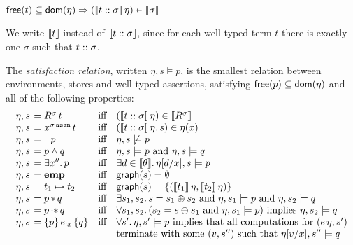 \documentclass[12pt,a4paper]{article}
\newcommand{\emp}{\ensuremath{\mathbf{emp}}}
\begin{document}
\begin{lemma}
  $\mathsf{free}(t) \subseteq \mathsf{dom}(\eta) \Rightarrow (\llbracket{t}\mathrel{::}{\sigma}\rrbracket\,\eta)\in\llbracket\sigma\rrbracket$
\end{lemma}

We write $\llbracket t\rrbracket$ instead of $\llbracket{t}\mathrel{::}{\sigma}\rrbracket$, since for each well typed term $t$ there is
exactly one $\sigma$ such that ${t}\mathrel{::}{\sigma}$.

\begin{definition}
  The {\em satisfaction relation}, written $\eta,s \models p$, is the smallest relation between 
  environments, stores and well typed assertions, satisfying $\mathsf{free}(p) \subseteq \mathsf{dom}(\eta)$ and all of the
  following properties:
  \[\begin{array}{lcl}
    \eta,s \models \app{R^\sigma}{t}
    &\text{iff}& (\semantic{\tj{t}{\sigma}}\,\eta) \in \semantic{R^\sigma} \\
    \eta,s \models \app{x^{\tassn[\sigma]}}{t}
    &\text{iff}& (\semantic{\tj{t}{\sigma}}\,\eta,s) \in \eta(x) \\
    \eta,s \models \neg p
    &\text{iff}& \eta,s \not\models p \\
    \eta,s \models p \wedge q
    &\text{iff}& \eta,s \models p \text{ and } \eta,s \models q \\
    \eta,s \models \exists x^\theta.\,p
    &\text{iff}& \exists d \in \semantic{\theta}.\,\eta[d/x],s \models p \\
    \eta,s \models \emp
    &\text{iff}& \grph{s} = \emptyset \\
    \eta,s \models t_1 \mapsto t_2
    &\text{iff}& \grph{s} = \{(\semantic{t_1}\,\eta,\semantic{t_2}\,\eta)\} \\
    \eta,s \models p \sepcon q
    &\text{iff}& \exists s_1,s_2.\,s=s_1 \oplus s_2 \text{ and } \eta,s_1 \models p \text{ and } \eta,s_2 \models q \\
    \eta,s \models p \sepimp q
    &\text{iff}& \forall s_1,s_2.\,(s_2 = s \oplus s_1 \text{ and } \eta,s_1 \models p) \text{ implies } \eta,s_2 \models q \\
    \eta,s \models \triplex{p}{e}{x}{q}
    &\text{iff}& \forall s'.\,\eta,s' \models p \text{ implies that all computations for } (e\,\eta,s') \\
    && \text{terminate with some $(v,s'')$ such that } \eta[v/x],s'' \models q
  \end{array}\]
\end{definition}
\end{document}
